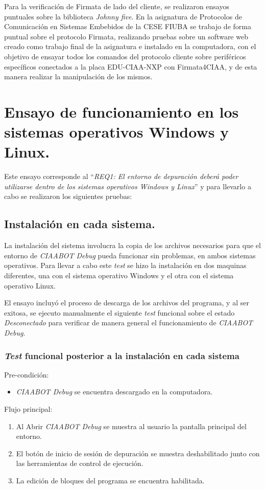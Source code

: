 Para la verificación de Firmata de lado del cliente, se realizaron ensayos puntuales sobre la biblioteca \emph{Johnny five}. En la asignatura de Protocolos de Comunicación en Sistemas Embebidos de la CESE FIUBA \citep{CESE} se trabajo de forma puntual sobre el protocolo Firmata, realizando pruebas sobre un software web creado como trabajo final de la asignatura e instalado en la computadora, con el objetivo de ensayar todos los comandos del protocolo cliente sobre periféricos específicos conectados a la placa EDU-CIAA-NXP con Firmata4CIAA, y de esta manera realizar la manipulación de los mismos.  


\section{Ensayo de funcionamiento en los sistemas operativos Windows y Linux.}
\label{sec:Ensayo de funcionamiento en los sistemas operativos Windows y Linux.}

Este ensayo corresponde al “\emph{REQ1: El entorno de depuración deberá poder utilizarse dentro de los sistemas operativos Windows y Linux}”  y para llevarlo a cabo se realizaron los siguientes pruebas:

\subsection{Instalación en cada sistema.}
\label{subsec:Instalación en cada sistema.}

La instalación del sistema involucra la copia de los archivos necesarios para que el entorno de \emph{CIAABOT Debug} pueda funcionar sin problemas, en ambos sistemas operativos. 
Para llevar a cabo este \emph{test} se hizo la instalación en dos maquinas diferentes, una con el sistema operativo Windows y el otra con el sistema operativo Linux. 

El ensayo incluyó el proceso de descarga de los archivos del programa, y al ser exitosa, se ejecuto manualmente el siguiente \emph{test} funcional  sobre el estado \emph{Desconectado} para verificar de manera general el funcionamiento de \emph{CIAABOT Debug}. 

\subsubsection{\emph{Test} funcional posterior a la instalación en cada sistema}
Pre-condición:
\begin{itemize}
	\item \emph{CIAABOT Debug} se encuentra descargado en la computadora.
\end{itemize}
Flujo principal:
\begin{enumerate}
	\item
     Al Abrir \emph{CIAABOT Debug} se muestra al usuario la pantalla principal del entorno.
	\item
	El botón de inicio de sesión de depuración se muestra deshabilitado junto con las herramientas de control de ejecución.
	\item
	La edición de bloques del programa se encuentra habilitada.
\end{enumerate}


